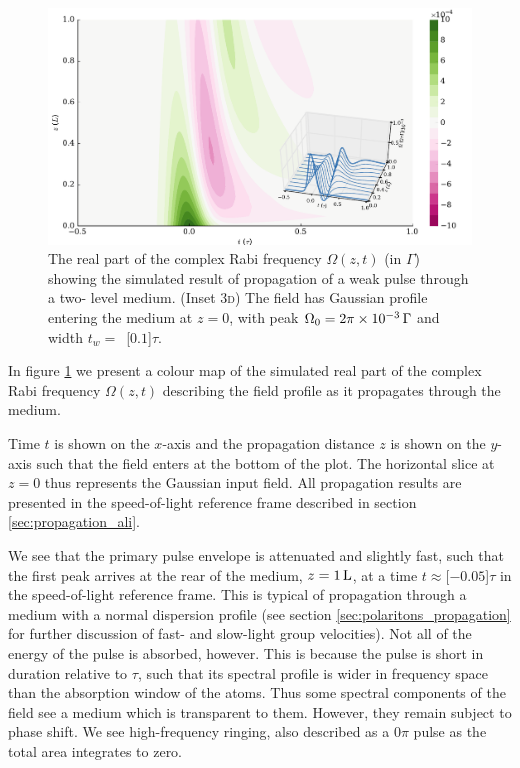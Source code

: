     \begin{figure}
      \includegraphics[width=\linewidth]{figs/02_propagation/mb_two_solve_wp_t01_Ng0100_T0_vel0_D0_fig1.pdf}
      \caption{
      The real part of the complex Rabi frequency $\Omega(z,t)$ (in $\Gamma$)
      showing the simulated result of propagation of a weak pulse through a two-
      level medium. (Inset \textsc{3d}) The field has Gaussian profile entering
      the medium at $z=0$, with peak $\Omega_0 =
      \unit[2\pi\times10^{-3}]{\Gamma}$ and width $t_w =$~\unit[$0.1$]{$\tau$}.
      }
      \label{fig:pulse_field}
    \end{figure}

    In figure \ref{fig:pulse_field} we present a colour map of the simulated
    real part of the complex Rabi frequency $\Omega(z,t)$ describing the field
    profile as it propagates through the medium.

    Time $t$ is shown on the $x$-axis and the propagation distance $z$ is shown
    on the $y$-axis such that the field enters at the bottom of the plot. The
    horizontal slice at $z = 0$ thus represents the Gaussian input field. All
    propagation results are presented in the speed-of-light reference frame
    described in section \ref{sec:propagation_ali}.

    We see that the primary pulse envelope is attenuated and slightly fast, such
    that the first peak arrives at the rear of the medium, $z = \unit[1]{L}$, at
    a time $t \approx $\unit[$-0.05$]{$\tau$} in the speed-of-light reference
    frame. This is typical of propagation through a medium with a normal
    dispersion profile (see section \ref{sec:polaritons_propagation} for further
    discussion of fast- and slow-light group velocities). Not all of the energy
    of the pulse is absorbed, however. This is because the pulse is short in
    duration relative to $\tau$, such that its spectral profile is wider in
    frequency space than the absorption window of the atoms. Thus some spectral
    components of the field see a medium which is transparent to them. However,
    they remain subject to phase shift. We see high-frequency ringing, also
    described as a $0\pi$ pulse as the total area integrates to
    zero.\cite{allen1975optical, Durrant1976}

